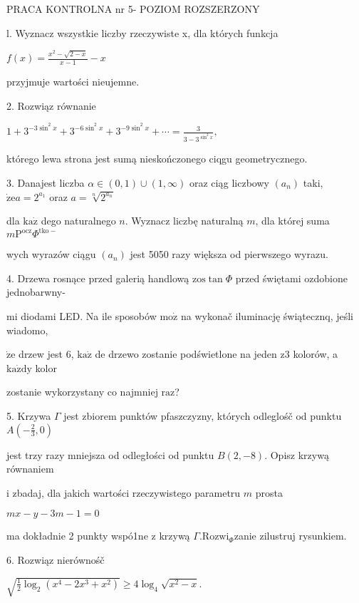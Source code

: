\documentclass[a4paper,12pt]{article}
\begin{document}
PRACA KONTROLNA nr 5- POZIOM ROZSZERZONY

l. Wyznacz wszystkie liczby rzeczywiste x, dla których funkcja

$f(x)=\displaystyle \frac{x^{2}-\sqrt{2-x}}{x-1}-x$

przyjmuje wartości nieujemne.

2. Rozwiąz równanie

$1+3^{-3\sin^{2}x}+3^{-6\sin^{2}x}+3^{-9\sin^{2}x}+\displaystyle \cdots=\frac{3}{3-3^{\sin^{2}x}},$

którego lewa strona jest sumą nieskończonego ciqgu geometrycznego.

3. Danajest liczba $\alpha\in(0,1)\cup(1,\infty)$ oraz ciąg liczbowy $(a_{n})$ taki, $\dot{\mathrm{z}}\mathrm{e}a=2^{a_{1}}$ oraz $a= \sqrt[n]{2^{a_{n}}}$

dla $\mathrm{k}\mathrm{a}\dot{\mathrm{z}}$ dego naturalnego $n$. Wyznacz liczbę naturalną $m$, dla której suma $m\mathrm{P}^{\mathrm{o}\mathrm{c}\mathrm{z}}\Phi^{\mathrm{t}\mathrm{k}\mathrm{o}-}$

wych wyrazów ciągu $(a_{n})$ jest 5050 razy większa od pierwszego wyrazu.

4. Drzewa rosnące przed galerią handlową $\mathrm{z}\mathrm{o}\mathrm{s}\tan\Phi$ przed świętami ozdobione jednobarwny-

mi diodami LED. Na ile sposobów $\mathrm{m}\mathrm{o}\dot{\mathrm{z}}$ na wykonač iluminację świątecznq, jeśli wiadomo,

$\dot{\mathrm{z}}\mathrm{e}$ drzew jest 6, $\mathrm{k}\mathrm{a}\dot{\mathrm{z}}$ de drzewo zostanie podświetlone na jeden $\mathrm{z}3$ kolorów, a $\mathrm{k}\mathrm{a}\dot{\mathrm{z}}\mathrm{d}\mathrm{y}$ kolor

zostanie wykorzystany co najmniej $\mathrm{r}\mathrm{a}\mathrm{z}$?

5. Krzywa $\Gamma$ jest zbiorem punktów pfaszczyzny, których odleglośč od punktu $A(-\displaystyle \frac{2}{3},0)$

jest trzy razy mniejsza od odległości od punktu $B(2,-8)$. Opisz krzywą równaniem

$\mathrm{i}$ zbadaj, dla jakich wartości rzeczywistego parametru $m$ prosta

$mx-y-3m-1=0$

ma dokładnie 2 punkty wspó1ne $\mathrm{z}$ krzywą $\Gamma. \mathrm{R}\mathrm{o}\mathrm{z}\mathrm{w}\mathrm{i}_{\Phi}$zanie zilustruj rysunkiem.

6. Rozwiąz nierównośč

$\sqrt{\frac{1}{2}\log_{2}(x^{4}-2x^{3}+x^{2})}\geq 4\log_{4}\sqrt{x^{2}-x}.$
\end{document}
